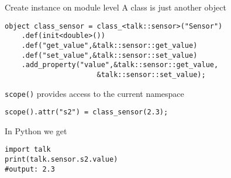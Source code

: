\begin{frame}[fragile]{Create instance on module level}
    A class is just another object
    \begin{verbatim}
object class_sensor = class_<talk::sensor>("Sensor")
    .def(init<double>())
    .def("get_value",&talk::sensor::get_value)
    .def("set_value",&talk::sensor::set_value)
    .add_property("value",&talk::sensor::get_value,
                      &talk::sensor::set_value); 
    \end{verbatim}
    \vspace{0.05\textheight} 
    \texttt{scope()} provides access to the current namespace
    \vspace{0.025\textheight}
    \begin{verbatim}
scope().attr("s2") = class_sensor(2.3);
    \end{verbatim}
    \vspace{0.05\textheight}
    In Python we get
    \begin{verbatim}
import talk
print(talk.sensor.s2.value)
#output: 2.3
    \end{verbatim}
\end{frame}


